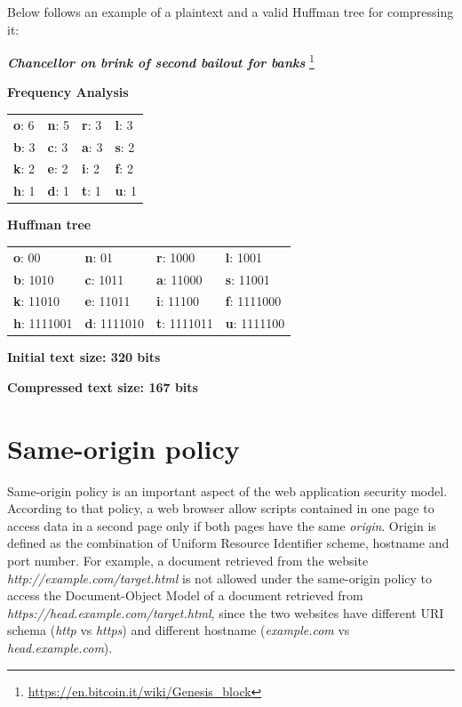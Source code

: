Below follows an example of a plaintext and a valid Huffman tree for compressing
it:

\bigskip \centerline{\textit{\textbf{Chancellor on brink of second bailout for
banks}} \footnote{\url{https://en.bitcoin.it/wiki/Genesis_block}}}

\bigskip \centerline{\textbf{Frequency Analysis}}

\begin{table}[H] \centering \begin{tabular}{ | l | l | l | l | } \hline
\textbf{o}: 6 & \textbf{n}: 5 & \textbf{r}: 3 & \textbf{l}: 3 \\ \textbf{b}: 3 &
\textbf{c}: 3 & \textbf{a}: 3 & \textbf{s}: 2 \\ \textbf{k}: 2 & \textbf{e}: 2 &
\textbf{i}: 2 & \textbf{f}: 2 \\ \textbf{h}: 1 & \textbf{d}: 1 & \textbf{t}: 1 &
\textbf{u}: 1 \\ \hline \end{tabular} \end{table}

\centerline{\textbf{Huffman tree}}

\begin{table}[H] \centering \begin{tabular}{ | l | l | l | l | } \hline
\textbf{o}: 00 & \textbf{n}: 01 & \textbf{r}: 1000 & \textbf{l}: 1001 \\
\textbf{b}: 1010 & \textbf{c}: 1011 & \textbf{a}: 11000 & \textbf{s}: 11001 \\
\textbf{k}: 11010 & \textbf{e}: 11011 & \textbf{i}: 11100 & \textbf{f}: 1111000
\\ \textbf{h}: 1111001 & \textbf{d}: 1111010 & \textbf{t}: 1111011 & \textbf{u}:
1111100 \\ \hline \end{tabular} \end{table}

\centerline{\textbf{Initial text size: 320 bits}} \centerline{\textbf{Compressed
text size: 167 bits}}

\section{Same-origin policy}\label{sec:sameorigin}

Same-origin policy is an important aspect of the web application security model.
According to that policy, a web browser allow scripts contained in one page to
access data in a second page only if both pages have the same \textit{origin}.
Origin is defined as the combination of Uniform Resource Identifier scheme,
hostname and port number. For example, a document retrieved from the website
\textit{http://example.com/target.html} is not allowed under the same-origin
policy to access the Document-Object Model of a document retrieved from
\textit{https://head.example.com/target.html}, since the two websites have
different URI schema (\textit{http} vs \textit{https}) and different hostname
(\textit{example.com} vs \textit{head.example.com}).

